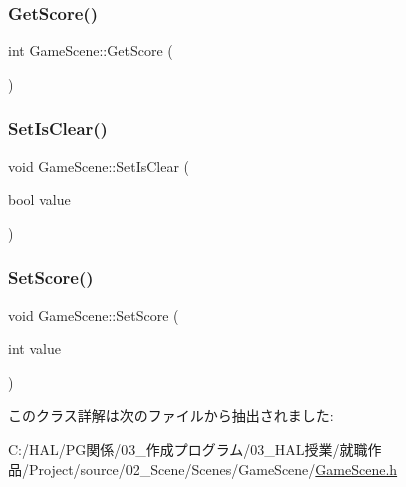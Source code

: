 \subsubsection{\texorpdfstring{Get\+Score()}{GetScore()}}
{\footnotesize\ttfamily int Game\+Scene\+::\+Get\+Score (\begin{DoxyParamCaption}{ }\end{DoxyParamCaption})\hspace{0.3cm}{\ttfamily [inline]}}

\mbox{\label{class_game_scene_aac6f0f69d7ad5745e49f41425d7df793}} 
\subsubsection{\texorpdfstring{Set\+Is\+Clear()}{SetIsClear()}}
{\footnotesize\ttfamily void Game\+Scene\+::\+Set\+Is\+Clear (\begin{DoxyParamCaption}\item[{bool}]{value }\end{DoxyParamCaption})\hspace{0.3cm}{\ttfamily [inline]}}

\mbox{\label{class_game_scene_aec5425818644ea2cb22ccffc89c56378}} 
\subsubsection{\texorpdfstring{Set\+Score()}{SetScore()}}
{\footnotesize\ttfamily void Game\+Scene\+::\+Set\+Score (\begin{DoxyParamCaption}\item[{int}]{value }\end{DoxyParamCaption})\hspace{0.3cm}{\ttfamily [inline]}}



このクラス詳解は次のファイルから抽出されました\+:\begin{DoxyCompactItemize}
\item 
C\+:/\+H\+A\+L/\+P\+G関係/03\+\_\+作成プログラム/03\+\_\+\+H\+A\+L授業/就職作品/\+Project/source/02\+\_\+\+Scene/\+Scenes/\+Game\+Scene/\mbox{\hyperlink{_game_scene_8h}{Game\+Scene.\+h}}\end{DoxyCompactItemize}
